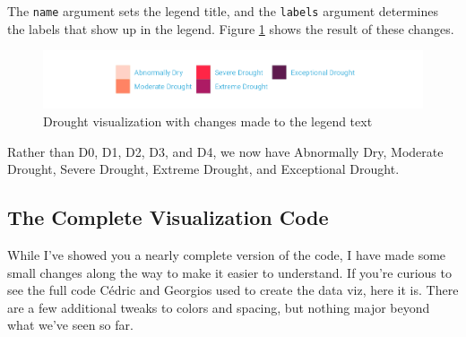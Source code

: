 \documentclass[
]{book}
\begin{document}
The \texttt{name} argument sets the legend title, and the \texttt{labels} argument determines the labels that show up in the legend. Figure \ref{fig:drought-viz-legend-tweaks} shows the result of these changes.

\begin{figure}
\includegraphics[width=1\linewidth]{data-viz_files/figure-latex/drought-viz-legend-tweaks-1} \caption{Drought visualization with changes made to the legend text}\label{fig:drought-viz-legend-tweaks}
\end{figure}

Rather than D0, D1, D2, D3, and D4, we now have Abnormally Dry, Moderate Drought, Severe Drought, Extreme Drought, and Exceptional Drought.

\hypertarget{the-complete-visualization-code}{%
\subsection*{The Complete Visualization Code}\label{the-complete-visualization-code}}

While I've showed you a nearly complete version of the code, I have made some small changes along the way to make it easier to understand. If you're curious to see the full code Cédric and Georgios used to create the data viz, here it is. There are a few additional tweaks to colors and spacing, but nothing major beyond what we've seen so far.
\end{document}
